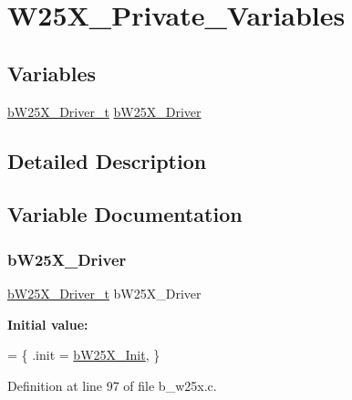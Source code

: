 \hypertarget{group___w25_x___private___variables}{}\section{W25\+X\+\_\+\+Private\+\_\+\+Variables}
\label{group___w25_x___private___variables}
\subsection*{Variables}
\begin{DoxyCompactItemize}
\item 
\mbox{\hyperlink{group___w25_x___exported___types_definitions_gadda45650bf6c5ce0216af3f25bb453dc}{b\+W25\+X\+\_\+\+Driver\+\_\+t}} \mbox{\hyperlink{group___w25_x___private___variables_gaf32f0de405f6f704a717654d70349629}{b\+W25\+X\+\_\+\+Driver}}
\end{DoxyCompactItemize}


\subsection{Detailed Description}


\subsection{Variable Documentation}
\mbox{\label{group___w25_x___private___variables_gaf32f0de405f6f704a717654d70349629}} 
\subsubsection{\texorpdfstring{b\+W25\+X\+\_\+\+Driver}{bW25X\_Driver}}
{\footnotesize\ttfamily \mbox{\hyperlink{group___w25_x___exported___types_definitions_gadda45650bf6c5ce0216af3f25bb453dc}{b\+W25\+X\+\_\+\+Driver\+\_\+t}} b\+W25\+X\+\_\+\+Driver}

{\bfseries Initial value\+:}
\begin{DoxyCode}
= 
\{
        .init = \mbox{\hyperlink{group___w25_x___exported___functions_gaf21a484dde17ecbe3be7b7ce034325e7}{bW25X\_Init}},
\}
\end{DoxyCode}


Definition at line 97 of file b\+\_\+w25x.\+c.

